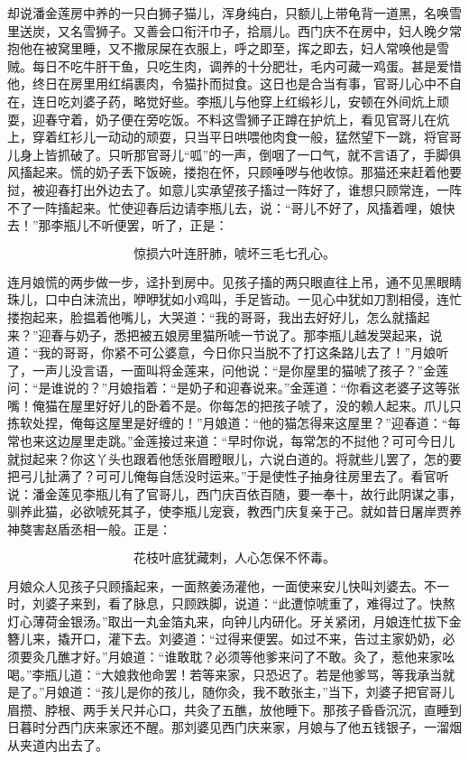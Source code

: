 却说潘金莲房中养的一只白狮子猫儿，浑身纯白，只额儿上带龟背一道黑，名唤雪里送炭，又名雪狮子。又善会口衔汗巾子，拾扇儿。西门庆不在房中，妇人晚夕常抱他在被窝里睡，又不撒尿屎在衣服上，呼之即至，挥之即去，妇人常唤他是雪贼。每日不吃牛肝干鱼，只吃生肉，调养的十分肥壮，毛内可藏一鸡蛋。甚是爱惜他，终日在房里用红绢裹肉，令猫扑而挝食。这日也是合当有事，官哥儿心中不自在，连日吃刘婆子药，略觉好些。李瓶儿与他穿上红缎衫儿，安顿在外间炕上顽耍，迎春守着，奶子便在旁吃饭。不料这雪狮子正蹲在护炕上，看见官哥儿在炕上，穿着红衫儿一动动的顽耍，只当平日哄喂他肉食一般，猛然望下一跳，将官哥儿身上皆抓破了。只听那官哥儿“呱”的一声，倒咽了一口气，就不言语了，手脚俱风搐起来。慌的奶子丢下饭碗，搂抱在怀，只顾唾哕与他收惊。那猫还来赶着他要挝，被迎春打出外边去了。如意儿实承望孩子搐过一阵好了，谁想只顾常连，一阵不了一阵搐起来。忙使迎春后边请李瓶儿去，说：“哥儿不好了，风搐着哩，娘快去！”那李瓶儿不听便罢，听了，正是：

\[
惊损六叶连肝肺，唬坏三毛七孔心。
\]

连月娘慌的两步做一步，迳扑到房中。见孩子搐的两只眼直往上吊，通不见黑眼睛珠儿，口中白沫流出，咿咿犹如小鸡叫，手足皆动。一见心中犹如刀割相侵，连忙搂抱起来，脸揾着他嘴儿，大哭道：“我的哥哥，我出去好好儿，怎么就搐起来？”迎春与奶子，悉把被五娘房里猫所唬一节说了。那李瓶儿越发哭起来，说道：“我的哥哥，你紧不可公婆意，今日你只当脱不了打这条路儿去了！”月娘听了，一声儿没言语，一面叫将金莲来，问他说：“是你屋里的猫唬了孩子？”金莲问：“是谁说的？”月娘指着：“是奶子和迎春说来。”金莲道：“你看这老婆子这等张嘴！俺猫在屋里好好儿的卧着不是。你每怎的把孩子唬了，没的赖人起来。爪儿只拣软处捏，俺每这屋里是好缠的！”月娘道：“他的猫怎得来这屋里？”迎春道：“每常也来这边屋里走跳。”金莲接过来道：“早时你说，每常怎的不挝他？可可今日儿就挝起来？你这丫头也跟着他恁张眉瞪眼儿，六说白道的。将就些儿罢了，怎的要把弓儿扯满了？可可儿俺每自恁没时运来。”于是使性子抽身往房里去了。看官听说：潘金莲见李瓶儿有了官哥儿，西门庆百依百随，要一奉十，故行此阴谋之事，驯养此猫，必欲唬死其子，使李瓶儿宠衰，教西门庆复亲于己。就如昔日屠岸贾养神獒害赵盾丞相一般。正是：

\[
花枝叶底犹藏刺，人心怎保不怀毒。
\]

月娘众人见孩子只顾搐起来，一面熬姜汤灌他，一面使来安儿快叫刘婆去。不一时，刘婆子来到，看了脉息，只顾跌脚，说道：“此遭惊唬重了，难得过了。快熬灯心薄荷金银汤。”取出一丸金箔丸来，向钟儿内研化。牙关紧闭，月娘连忙拔下金簪儿来，撬开口，灌下去。刘婆道：“过得来便罢。如过不来，告过主家奶奶，必须要灸几醮才好。”月娘道：“谁敢耽？必须等他爹来问了不敢。灸了，惹他来家吆喝。”李瓶儿道：“大娘救他命罢！若等来家，只恐迟了。若是他爹骂，等我承当就是了。”月娘道：“孩儿是你的孩儿，随你灸，我不敢张主，”当下，刘婆子把官哥儿眉攒、脖根、两手关尺并心口，共灸了五醮，放他睡下。那孩子昏昏沉沉，直睡到日暮时分西门庆来家还不醒。那刘婆见西门庆来家，月娘与了他五钱银子，一溜烟从夹道内出去了。

